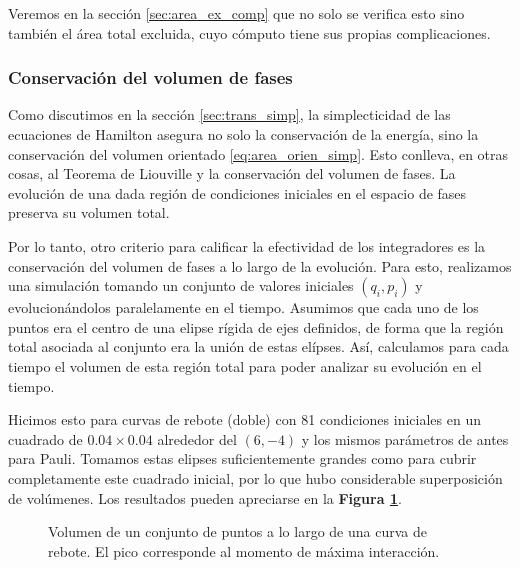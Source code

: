 Veremos en la sección \ref{sec:area_ex_comp} que no solo se verifica esto sino también el área total excluida, cuyo cómputo tiene sus propias complicaciones.


\subsubsection{Conservación del volumen de fases}

Como discutimos en la sección \ref{sec:trans_simp}, la simplecticidad de las ecuaciones de Hamilton asegura no solo la conservación de la energía, sino la conservación del volumen orientado \eqref{eq:area_orien_simp}.
Esto conlleva, en otras cosas, al Teorema de Liouville y la conservación del volumen de fases.
La evolución de una dada región de condiciones iniciales en el espacio de fases preserva su volumen total.

Por lo tanto, otro criterio para calificar la efectividad de los integradores es la conservación del volumen de fases a lo largo de la evolución.
Para esto, realizamos una simulación tomando un conjunto de valores iniciales $(q_i, p_i)$ y evolucionándolos paralelamente en el tiempo.
Asumimos que cada uno de los puntos era el centro de una elipse rígida de ejes definidos, de forma que la región total asociada al conjunto era la unión de estas elípses.
Así, calculamos para cada tiempo el volumen de esta región total para poder analizar su evolución en el tiempo.

Hicimos esto para curvas de rebote (doble) con 81 condiciones iniciales en un cuadrado de $0.04\times0.04$ alrededor del $(6, -4)$ y los mismos parámetros de antes para Pauli.
Tomamos estas elipses suficientemente grandes como para cubrir completamente este cuadrado inicial, por lo que hubo considerable superposición de volúmenes.
Los resultados pueden apreciarse en la \textbf{Figura \ref{fig:vol_fas}}.

\begin{figure}[h]
	\centering
	\caption{Volumen de un conjunto de puntos a lo largo de una curva de rebote. El pico corresponde al momento de máxima interacción.}
	\label{fig:vol_fas}
\end{figure}

